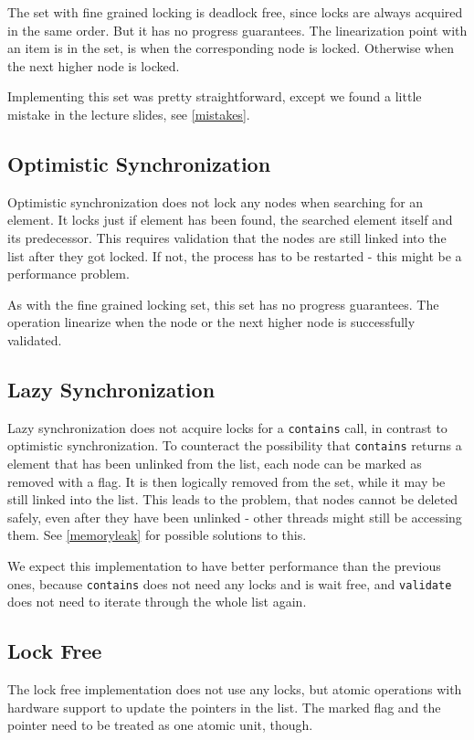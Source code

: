 The set with fine grained locking is deadlock free, since locks are always acquired in the same order. But it has no progress guarantees. The linearization point with an item is in the set, is when the corresponding node is locked. Otherwise when the next higher node is locked.

Implementing this set was pretty straightforward, except we found a little mistake in the lecture slides, see \ref{mistakes}.

\subsection{Optimistic Synchronization}
Optimistic synchronization does not lock any nodes when searching for an element. It locks just if element has been found, the searched element itself and its predecessor. This requires validation that the nodes are still linked into the list after they got locked. If not, the process has to be restarted - this might be a performance problem.

As with the fine grained locking set, this set has no progress guarantees. The operation linearize when the node or the next higher node is successfully validated.

\subsection{Lazy Synchronization}
Lazy synchronization does not acquire locks for a \texttt{contains} call, in contrast to optimistic synchronization. To counteract the possibility that \texttt{contains} returns a element that has been unlinked from the list, each node can be marked as removed with a flag. It is then logically removed from the set, while it may be still linked into the list. This leads to the problem, that nodes cannot be deleted safely, even after they have been unlinked - other threads might still be accessing them. See \ref{memoryleak} for possible solutions to this.

We expect this implementation to have better performance than the previous ones, because \texttt{contains} does not need any locks and is wait free, and \texttt{validate} does not need to iterate through the whole list again.

\subsection{Lock Free}
The lock free implementation does not use any locks, but atomic operations with hardware support to update the pointers in the list. The marked flag and the pointer need to be treated as one atomic unit, though.

